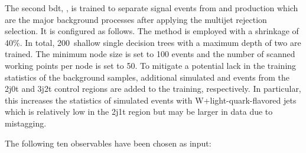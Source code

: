 
The second \gls{bdt}, \bdttch, is trained to separate signal events from \wjets and \ttbar production which are the major background processes after applying the multijet rejection selection. It is configured as follows. The \GRADIENTBOOST method is employed with a shrinkage of 40\%. In total, 200~shallow single decision trees with a maximum depth of two are trained. The minimum node size is set to 100 events and the number of scanned working points per node is set to 50. To mitigate a potential lack in the training statistics of the background samples, additional simulated \wjets and \ttbar events from the 2j0t and 3j2t control regions are added to the training, respectively. In particular, this increases the statistics of simulated events with W+light-quark-flavored jets which is relatively low in the 2j1t region but may be larger in data due to mistagging. 

The following ten observables have been chosen as input:

